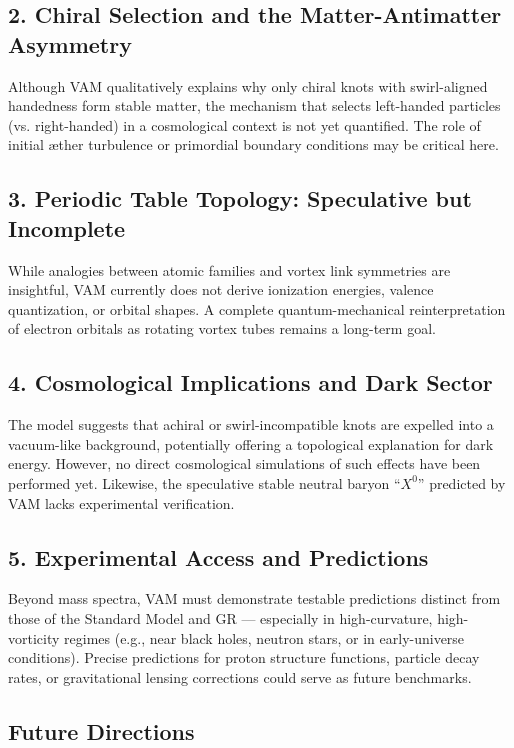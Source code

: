\subsection*{2. Chiral Selection and the Matter-Antimatter Asymmetry}
Although VAM qualitatively explains why only chiral knots with swirl-aligned handedness form stable matter, the mechanism that selects left-handed particles (vs. right-handed) in a cosmological context is not yet quantified. The role of initial æther turbulence or primordial boundary conditions may be critical here.

\subsection*{3. Periodic Table Topology: Speculative but Incomplete}
While analogies between atomic families and vortex link symmetries are insightful, VAM currently does not derive ionization energies, valence quantization, or orbital shapes. A complete quantum-mechanical reinterpretation of electron orbitals as rotating vortex tubes remains a long-term goal.

\subsection*{4. Cosmological Implications and Dark Sector}
The model suggests that achiral or swirl-incompatible knots are expelled into a vacuum-like background, potentially offering a topological explanation for dark energy. However, no direct cosmological simulations of such effects have been performed yet. Likewise, the speculative stable neutral baryon “$X^0$” predicted by VAM lacks experimental verification.

\subsection*{5. Experimental Access and Predictions}
Beyond mass spectra, VAM must demonstrate testable predictions distinct from those of the Standard Model and GR — especially in high-curvature, high-vorticity regimes (e.g., near black holes, neutron stars, or in early-universe conditions). Precise predictions for proton structure functions, particle decay rates, or gravitational lensing corrections could serve as future benchmarks.

\subsection*{Future Directions}


